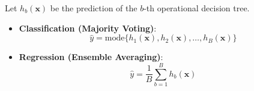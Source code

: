 	Let $h_b(\mathbf{x})$ be the prediction of the $b$-th operational decision tree.
	
	\begin{itemize}
		\item \textbf{Classification (Majority Voting)}:
		\begin{equation}
		\hat{y} = \text{mode} \Big\{ h_1(\mathbf{x}), h_2(\mathbf{x}), \dots, h_B(\mathbf{x}) \Big\}
		\end{equation}
		
		\item \textbf{Regression (Ensemble Averaging)}:
		\begin{equation}
		\hat{y} = \frac{1}{B} \sum_{b=1}^{B} h_b(\mathbf{x})
		\end{equation}
	\end{itemize}
	

	
\newpage